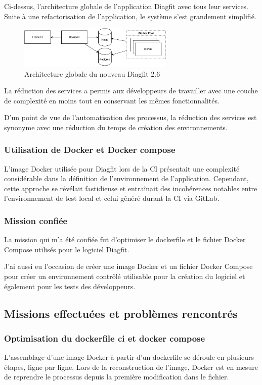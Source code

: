 Ci-dessus, l'architecture globale de l'application Diagfit avec tous leur services.
Suite à une refactorisation de l'application, le système s'est grandement simplifié.

\begin{figure}[ht!]
    \centering
    \includegraphics[width=0.66\textwidth]{paper/figures/archi2-6.pdf}
    \caption{Architecture globale du nouveau Diagfit 2.6}
    \label{fig:archi2-6}
\end{figure}

La réduction des services a permis aux développeurs de travailler avec une couche de complexité en moins tout en conservant les mêmes fonctionnalités.

D'un point de vue de l'automatisation des processus, la réduction des services est synonyme avec une réduction du temps de création des environnements.

\subsubsection{Utilisation de Docker et Docker compose}
L'image Docker utilisée pour Diagfit lors de la CI présentait une complexité considérable dans la définition de l'environnement de l'application.
Cependant, cette approche se révélait fastidieuse et entraînait des incohérences notables entre l'environnement de test local et celui généré durant la CI via GitLab.

\subsubsection{Mission confiée}
La mission qui m'a été confiée fut d'optimiser le dockerfile et le fichier Docker Compose utilisés pour le logiciel Diagfit.

J'ai aussi eu l'occasion de créer une image Docker et un fichier Docker Compose pour créer un environnement contrôlé utilisable pour la création du logiciel et également pour les tests des développeurs.

\subsection{Missions effectuées et problèmes rencontrés}
\subsubsection{Optimisation du dockerfile ci et docker compose}
L'assemblage d'une image Docker à partir d'un dockerfile se déroule en plusieurs étapes, ligne par ligne.
Lors de la reconstruction de l'image, Docker est en mesure de reprendre le processus depuis la première modification dans le fichier.

